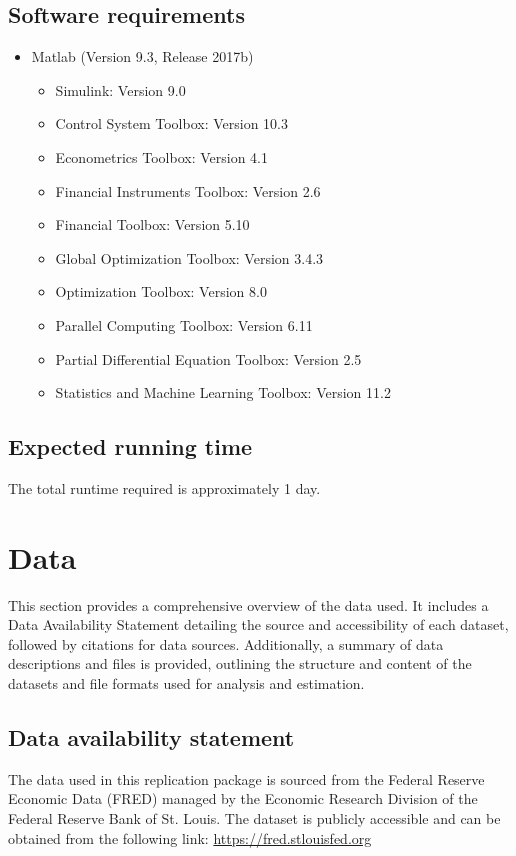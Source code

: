 \documentclass{article}
\begin{document}
	
	\subsection{Software requirements}
	
	\begin{itemize}
		\item Matlab (Version 9.3, Release 2017b)
		\begin{itemize}
			\item Simulink: Version 9.0
			\item Control System Toolbox: Version 10.3
			\item Econometrics Toolbox: Version 4.1
			\item Financial Instruments Toolbox: Version 2.6
			\item Financial Toolbox: Version 5.10
			\item Global Optimization Toolbox: Version 3.4.3
			\item Optimization Toolbox: Version 8.0
			\item Parallel Computing Toolbox: Version 6.11
			\item Partial Differential Equation Toolbox: Version 2.5
			\item Statistics and Machine Learning Toolbox: Version 11.2
		\end{itemize}
		
	\end{itemize}
	
	\subsection{Expected running time}
	The total runtime required is approximately 1 day.
	
	\section{Data}
	This section provides a comprehensive overview of the data used. It includes a Data Availability Statement detailing the source and accessibility of each dataset, followed by citations for data sources. Additionally, a summary of data descriptions and files is provided, outlining the structure and content of the datasets and file formats used for analysis and estimation.
	\subsection{Data availability statement}
	The data used in this replication package is sourced from the Federal Reserve Economic Data (FRED) managed by the Economic Research Division of the Federal Reserve Bank of St. Louis. The dataset is publicly accessible and can be obtained from the following link:
	\url{https://fred.stlouisfed.org}
	
\end{document}
